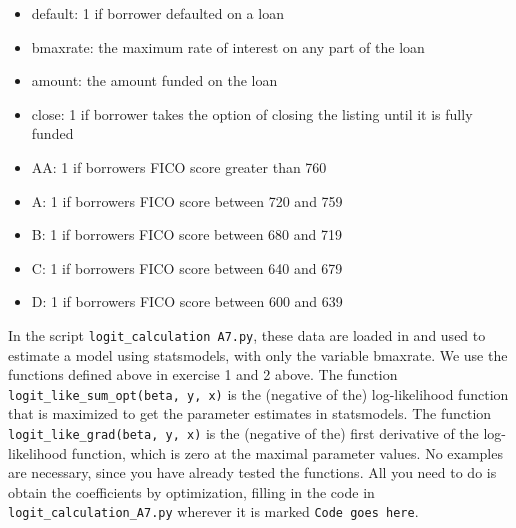 \documentclass[11pt]{exam}
\begin{document}
\begin{questions}
\begin{itemize}
\item default: 1 if borrower defaulted on a loan
\item bmaxrate: the maximum rate of interest on any part of the loan
\item amount: the amount funded on the loan
\item close: 1 if borrower takes the option of closing the listing until it is fully funded
\item AA: 1 if borrowers FICO score greater than 760
\item A: 1 if borrowers FICO score between 720 and 759
\item B: 1 if borrowers FICO score between 680 and 719
\item C: 1 if borrowers FICO score between 640 and 679
\item D: 1 if borrowers FICO score between 600 and 639
\end{itemize}

In the script \texttt{logit\_calculation A7.py}, these data are loaded in and used to estimate a model
using statsmodels, with only the variable bmaxrate. We use the functions defined above in exercise 1 and 2 above. The function \texttt{logit\_like\_sum\_opt(beta, y, x)} is the (negative of the) log-likelihood function that is maximized to get the parameter estimates in statsmodels. The function \texttt{logit\_like\_grad(beta, y, x)} is the (negative of the) first derivative of the log-likelihood function, which is zero at the maximal parameter values. No examples are necessary, since you have already tested the functions. All you need to do is obtain the coefficients by optimization, filling in the code in \texttt{logit\_calculation\_A7.py} wherever it is marked \texttt{Code goes here}.

\end{questions}
\end{document}
